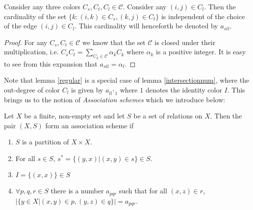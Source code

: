 	 \begin{lemma}\label{intersectionnum}
		 Consider any three colors $C_s,C_t,C_l \in \mathcal{C}$. Consider any $(i,j) \in C_l$. Then the cardinality of the set $\{k: (i,k) \in C_s,(k,j) \in C_t\}$ is independent of the choice of the edge $(i,j) \in C_l$.
		 This cardinality will henceforth be denoted by $a_{stl}$.
	 \end{lemma}
	
	\begin{proof}
		For any $C_s,C_t \in \mathcal{C}$ we know that the set $\mathcal{C}$ is closed under their multiplication, i.e. $C_sC_t = \sum_{C_k \in \mathcal{C}} \alpha_k C_k$ where $\alpha_k$ is a positive integer. It is easy
		to see from this expansion that $a_{stl} = \alpha_l$.
	\end{proof}

	Note that lemma \ref{regular} is a special case of lemma \ref{intersectionnum}, where the out-degree of color $C_l$ is given by $a_{ll^\top1}$ where $1$ denotes the identity color $I$. This brings us to the notion of 
	\emph{Association schemes} which we introduce below:

	\begin{definition}\label{scheme} Let $X$ be a finite, non-empty set and let $S$ be a set of relations on $X$. Then the pair $(X,S)$ form an association scheme if
		\begin{enumerate}
			\item $S$ is a partition of $X\times X$.
			\item For all $s \in S$, $s^* = \{(y,x)|(x,y) \in s\} \in S$.
			\item $I = \{(x,x)\}\in S$
			\item $\forall p,q,r \in S$ there is a number $a_{pqr}$ such that for all $(x,z) \in r$, $|\{y \in X| (x,y) \in p, (y,z) \in q\}|=a_{pqr}$.
		\end{enumerate}
	\end{definition}




